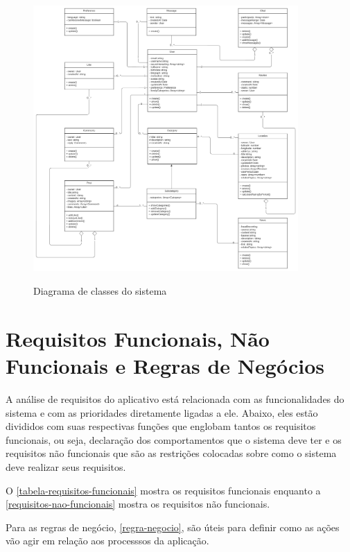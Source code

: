\begin{figure}[htb]
	\centering
	\caption{\label{fig_arq_virado}Diagrama de classes do sistema}
	\includegraphics[width=0.90\textwidth]{anexos/diversaGente_-_Classe_UML_1.png}
	\label{diagrama-classe}
\end{figure}

\section{Requisitos Funcionais, Não Funcionais e Regras de Negócios}


A análise de requisitos do aplicativo está relacionada com as funcionalidades do sistema e com as prioridades diretamente ligadas a ele. Abaixo, eles estão divididos com suas respectivas funções que englobam tantos os requisitos funcionais, ou seja, declaração dos comportamentos que o sistema deve ter e os requisitos não funcionais que são as restrições colocadas sobre como o sistema deve realizar seus requisitos.

O  \autoref{tabela-requisitos-funcionais} mostra os requisitos funcionais  enquanto a \autoref{requisitos-nao-funcionais} mostra os requisitos não funcionais. 

Para as regras de negócio, \autoref{regra-negocio}, são úteis para definir como as ações vão agir em relação aos processsos da aplicação. 




